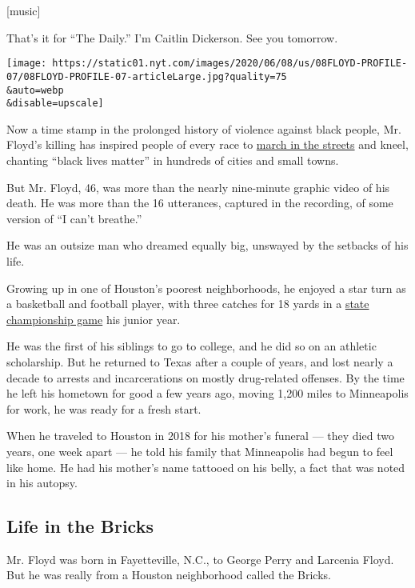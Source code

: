 {[}music{]}

That's it for ``The Daily.'' I'm Caitlin Dickerson. See you tomorrow.

\texttt{[image: https://static01.nyt.com/images/2020/06/08/us/08FLOYD-PROFILE-07/08FLOYD-PROFILE-07-articleLarge.jpg?quality=75\\\&auto=webp\\\&disable=upscale]}

Now a time stamp in the prolonged history of violence against black
people, Mr. Floyd's killing has inspired people of every race to
\href{https://www.nytimes.com/2020/06/06/us/george-floyd-memorial-protests.html}{march
in the streets} and kneel, chanting ``black lives matter'' in hundreds
of cities and small towns.

But Mr. Floyd, 46, was more than the nearly nine-minute graphic video of
his death. He was more than the 16 utterances, captured in the
recording, of some version of ``I can't breathe.''

He was an outsize man who dreamed equally big, unswayed by the setbacks
of his life.

Growing up in one of Houston's poorest neighborhoods, he enjoyed a star
turn as a basketball and football player, with three catches for 18
yards in a
\href{https://www.expressnews.com/texas-sports-nation/highschool/article/George-Floyd-death-Yates-High-School-football-15298818.php}{state
championship game} his junior year.

He was the first of his siblings to go to college, and he did so on an
athletic scholarship. But he returned to Texas after a couple of years,
and lost nearly a decade to arrests and incarcerations on mostly
drug-related offenses. By the time he left his hometown for good a few
years ago, moving 1,200 miles to Minneapolis for work, he was ready for
a fresh start.

When he traveled to Houston in 2018 for his mother's funeral --- they
died two years, one week apart --- he told his family that Minneapolis
had begun to feel like home. He had his mother's name tattooed on his
belly, a fact that was noted in his autopsy.

\hypertarget{life-in-the-bricks}{%
\subsection{Life in the Bricks}\label{life-in-the-bricks}}

Mr. Floyd was born in Fayetteville, N.C., to George Perry and Larcenia
Floyd. But he was really from a Houston neighborhood called the Bricks.

